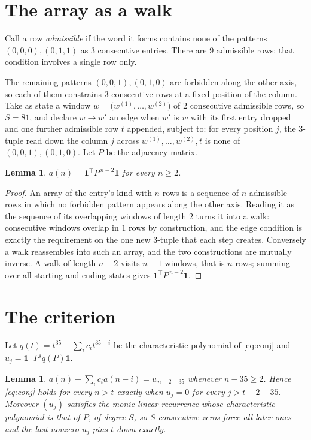 \documentclass[11pt,a4paper]{article}
\theoremstyle{plain}
\newtheorem{lemma}[theorem]{Lemma}
\theoremstyle{definition}
\begin{document}
\section{The array as a walk}

Call a row \emph{admissible} if the word it forms contains none of the patterns
$(0,0,0), (0,1,1)$ as $3$ consecutive entries. There are $9$ admissible rows; that condition
involves a single row only.

The remaining patterns $(0,0,1), (0,1,0)$ are forbidden along the other axis, so each of them
constrains $3$ consecutive rows at a fixed position of the column. Take as state a
window $w=\bigl(w^{(1)},\dots,w^{(2)}\bigr)$ of $2$ consecutive admissible
rows, so $S=81$, and declare $w\to w'$ an edge when $w'$ is $w$ with its first entry
dropped and one further admissible row $t$ appended, subject to: for every position
$j$, the $3$-tuple read down the column $j$ across $w^{(1)},\dots,w^{(2)},t$
is none of $(0,0,1), (0,1,0)$. Let $P$ be the adjacency matrix.

\begin{lemma}\label{lem:walk}
$a(n)=\mathbf{1}^{\!\top}P^{\,n-2}\mathbf{1}$ for every $n\ge2$.
\end{lemma}

\begin{proof}
An array of the entry's kind with $n$ rows is a sequence of $n$ admissible rows in
which no forbidden pattern appears along the other axis. Reading it as the sequence of its
overlapping windows of length $2$ turns it into a walk: consecutive windows overlap in
$1$ rows by construction, and the edge condition is exactly the requirement on the one
new $3$-tuple that each step creates. Conversely a walk reassembles into such an array,
and the two constructions are mutually inverse. A walk of length $n-2$ visits $n-1$
windows, that is $n$ rows; summing over all starting and ending states gives
$\mathbf{1}^{\!\top}P^{\,n-2}\mathbf{1}$.
\end{proof}

\section{The criterion}

Let $q(t)=t^{35}-\sum_i c_i t^{35-i}$ be the characteristic polynomial of
\eqref{eq:conj} and $u_j=\mathbf{1}^{\!\top}P^{j}q(P)\mathbf{1}$.

\begin{lemma}\label{lem:crit}
$a(n)-\sum_i c_i a(n-i)=u_{\,n-2-35}$ whenever $n-35\ge2$. Hence
\eqref{eq:conj} holds for every $n>t$ exactly when $u_j=0$ for every
$j>t-2-35$. Moreover $(u_j)$ satisfies the monic linear recurrence whose
characteristic polynomial is that of $P$, of degree $S$, so $S$ consecutive zeros force all
later ones and the last nonzero $u_j$ pins $t$ down exactly.
\end{lemma}
\end{document}

